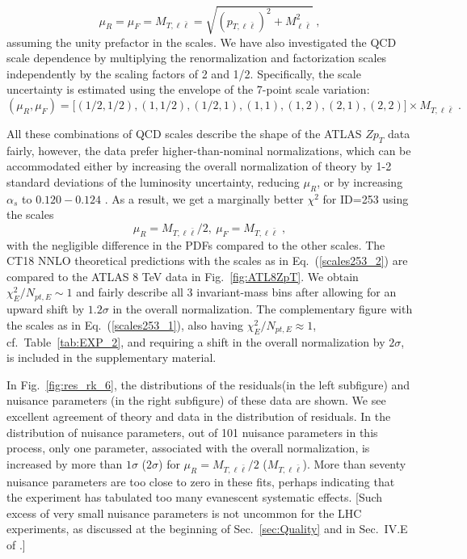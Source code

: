 \begin{equation}
\mu_{R}=\mu_{F}=M_{T, \ell \bar \ell}=\sqrt{(p_{T, \ell \bar \ell})^{2}+M_{\ell \bar \ell}^{2}}\; ,
\label{scales253_1}
\end{equation}
assuming the unity prefactor in the scales. 
We have also investigated the QCD scale dependence by multiplying the renormalization and 
factorization scales independently by the scaling factors of 2 and 1/2.
Specifically, the scale uncertainty is estimated using the envelope of the 7-point scale variation:
\begin{equation}
(\mu_{R},\mu_{F}) = \big[(1/2, 1/2),(1, 1/2),(1/2, 1),(1, 1),(1, 2),(2, 1),(2, 2)\big] \times M_{T, \ell \bar \ell}
\;.
\end{equation}

All these combinations of QCD scales describe the shape of the ATLAS $Z p_T$ data fairly, however, the data prefer  higher-than-nominal normalizations, which can be accommodated either by increasing the overall normalization of theory by 1-2 standard deviations of the luminosity uncertainty, reducing $\mu_R$, or by increasing $\alpha_s$ to $0.120-0.124$ \cite{Forte:2020pyp}. As a result, we get a marginally better $\chi^2$ for ID=253 using the scales
\begin{equation}
\mu_{R}=M_{T, \ell \bar \ell}/2, ~\mu_{F}=M_{T, \ell \bar \ell}\;,
\label{scales253_2}
\end{equation}
with the negligible difference in the PDFs compared to the other scales. 
The CT18 NNLO theoretical predictions with the scales as in Eq.~(\ref{scales253_2}) are compared to the ATLAS 8 TeV data in Fig.~\ref{fig:ATL8ZpT}. We obtain $\chi^2_E/N_{pt,E}\sim 1$ and fairly describe all 3 invariant-mass bins after allowing for an upward shift by $1.2\sigma$ in the overall normalization. 
The complementary figure with the scales as in Eq.~(\ref{scales253_1}), also having $\chi^2_E/N_{pt,E} \approx 1$, cf.~Table~\ref{tab:EXP_2}, and requiring a shift in the overall normalization by $2\sigma$, is included in the supplementary material.

In Fig.~\ref{fig:res_rk_6}, the distributions of the residuals(in the left subfigure) and nuisance parameters (in the right subfigure) of these data are shown.  
We see excellent agreement of theory and data in the distribution of residuals. In the distribution of nuisance parameters, out of 101 nuisance parameters in this process, only one parameter, associated with the overall normalization, is increased by more than $1\sigma$ ($2\sigma$) for $\mu_R=M_{T, \ell \bar \ell}/2$ ($M_{T, \ell \bar \ell}$). More than seventy nuisance parameters are too 
close to zero in these fits, perhaps indicating that the experiment has tabulated too many evanescent systematic effects. [Such excess of very small nuisance parameters is not uncommon for the LHC experiments, as discussed at the beginning of Sec.~\ref{sec:Quality} and in Sec.~IV.E of \cite{Kovarik:2019xvh}.]



